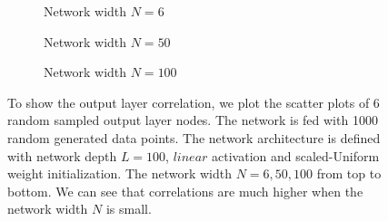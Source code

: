 \begin{figure}
  \centering
  \newcommand{\myWidth}{.95\textwidth}
  \begin{subfigure}{\myWidth}
    \centering
    \caption{Network width $N=6$}
    \label{fig:sec4_sim13_a}
  \end{subfigure}%
  
  \begin{subfigure}{\myWidth}
    \centering
    \caption{Network width $N=50$}
    \label{fig:sec4_sim13_b}
  \end{subfigure}%
  
  \begin{subfigure}{\myWidth}
    \centering
    \caption{Network width $N=100$}
    \label{fig:sec4_sim13_c}
  \end{subfigure}%
  
\caption[Scatter plots for the $linear$ activation and the scaled-uniform initialization.]
{To show the output layer correlation, we plot the scatter plots of 6 random sampled output
layer nodes. The network is fed with 1000 random generated data points.
The network architecture is defined with network depth $L=100$,
$linear$ activation and scaled-Uniform weight initialization. The network width
$N=6, 50, 100$ from top to bottom. We can see that correlations are much higher
when the network width $N$ is small.}
\label{fig:sec4_sim13}
\end{figure}


